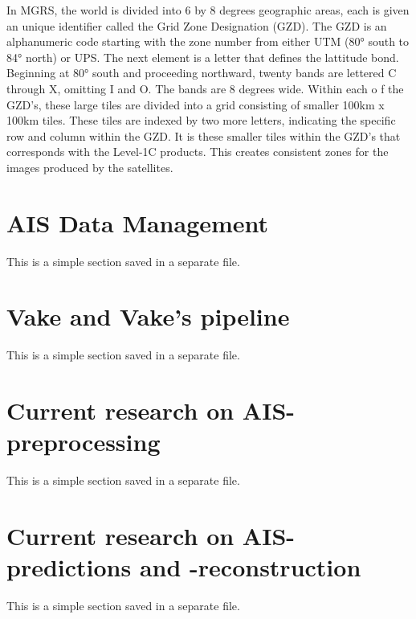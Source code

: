 In MGRS, the world is divided into 6 by 8 degrees geographic areas, each is given an unique identifier called the Grid Zone Designation (GZD). \cite{NationalGeospatial-IntelligenceAgency2014} The GZD is an alphanumeric code starting with the zone number from either UTM (80° south to 84° north) or UPS. The next element is a letter that defines the lattitude bond. Beginning at 80° south and proceeding northward, twenty bands are lettered C through X, omitting I and O. The bands are 8 degrees wide. Within each o f the GZD's, these large tiles are divided into a grid consisting of smaller 100km x 100km tiles. These tiles are indexed by two more letters, indicating the specific row and column within the GZD. It is these smaller tiles within the GZD's that corresponds with the Level-1C products. This creates consistent zones for the images produced by the satellites.



\section{AIS Data Management}
\begin{info}{}
	This is a simple section saved in a separate file.
\end{info}

\section{Vake and Vake's pipeline}
\begin{info}{}
	This is a simple section saved in a separate file.
\end{info}





\section{Current research on AIS-preprocessing}
\begin{info}{}
	This is a simple section saved in a separate file.
\end{info}





\section{Current research on AIS-predictions and -reconstruction}
\begin{info}{}
	This is a simple section saved in a separate file.
\end{info}







